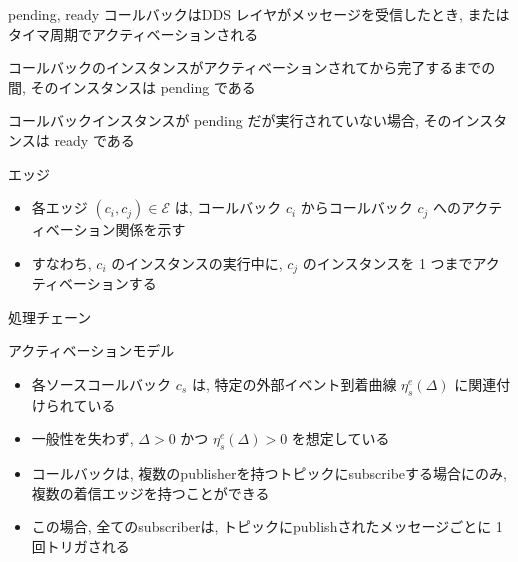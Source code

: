 \begin{frame}{pending, ready}
    コールバックはDDS レイヤがメッセージを受信したとき, またはタイマ周期でアクティベーションされる
    \begin{definition}[pending]
        コールバックのインスタンスがアクティベーションされてから完了するまでの間, そのインスタンスは pending である
    \end{definition}
    \begin{definition}[ready]
        コールバックインスタンスが pending だが実行されていない場合, そのインスタンスは ready である
    \end{definition}
\end{frame}

\begin{frame}{エッジ}
    \begin{itemize}
        \item 各エッジ $\left(c_{i}, c_{j}\right) \in \mathcal{E}$ は, コールバック $c_{i}$ からコールバック $c_{j}$ へのアクティベーション関係を示す
        \item すなわち, $c_{i}$ のインスタンスの実行中に, $c_{j}$ のインスタンスを 1 つまでアクティベーションする
    \end{itemize}
\end{frame}

\begin{frame}{処理チェーン}
\end{frame}

\begin{frame}{アクティベーションモデル}
    \begin{itemize}
        \item 各ソースコールバック $c_{s}$ は, 特定の外部イベント到着曲線 $\eta_{s}^{e}(\Delta)$ に関連付けられている
        \item 一般性を失わず, $\Delta>0$ かつ $\eta_{s}^{e}(\Delta)>0$ を想定している
        \item コールバックは, 複数のpublisherを持つトピックにsubscribeする場合にのみ, 複数の着信エッジを持つことができる
        \item この場合, 全てのsubscriberは, トピックにpublishされたメッセージごとに 1 回トリガされる
    \end{itemize}
\end{frame}

